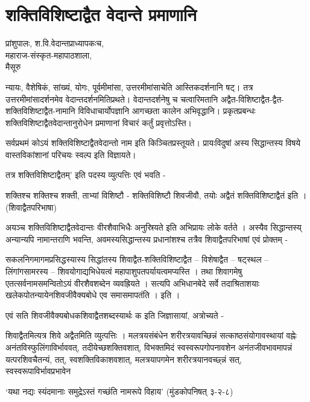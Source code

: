 \chapter{शक्तिविशिष्टाद्वैत वेदान्ते प्रमाणानि}

\begin{center}
\smallskip
प्रांशुपालः, श.वि.वेदान्तप्राध्यापकःच,\\
महाराज-संस्कृत-महापाठशाला,\\
मैसूरु
\addrule
\end{center}
न्यायः, वैशेषिकं, सांख्यं, योगः, पूर्वमीमांसा, उत्तरमीमांसाचेति आस्तिकदर्शनानि षट्। तत्र उत्तरमीमांसादर्शनमेव वेदान्तदर्शनमितिप्रथते। वेदान्तदर्शनेषु च चत्वारिमतानि अद्वैत-विशिष्टाद्वैत-द्वैत-शक्तिविशिष्टाद्वैत-नामानि विविधाचार्योपज्ञानि आगच्छता कालेन अभिवृद्धानि। प्रकृतप्रबन्धः शक्तिविशिष्टाद्वैतवेदान्तानुरोधेन प्रमाणानां विचारं कर्तुं प्रवृत्तोऽस्ति।

सर्वप्रथमं कोऽयं शक्तिविशिष्टाद्वैतवेदान्तो नाम इति किञ्चितप्रस्तूयते। प्रायःविदुषां अस्य सिद्धान्तस्य विषये वास्तविकांशानां परिचयः स्वल्प इति विज्ञायते।

तत्र  शक्तिविशिष्टाद्वैतम्’ इति पदस्य व्युत्पत्तिः एवं भवति -

शक्तिश्च शक्तिश्च शक्ती, ताभ्यां विशिष्टौ -  शक्तिविशिष्टौ शिवजीवौ, तयोः अद्वैतं शक्तिविशिष्टाद्वैतं इति ।(शिवाद्वैतपरिभाषा)

अयञ्च शक्तिविशिष्टाद्वैतवेदान्तः वीरशैवाभिधैः अनुस्रियते इति अभिप्रायः लोके वर्तते । अस्यैव सिद्धान्तस्य् अन्यान्यपि नामान्तराणि भवन्ति, अवमस्यसिद्धान्तस्य प्रधानांशश्च तत्रैव शिवाद्वैतपरिभाषां एवं प्रोक्तम् -

सकलनिगमागमप्रसिद्धस्यास्य सिद्धांतस्य शिवाद्वैत-शक्तिविशिष्टाद्वैत – विशेषाद्वैत – षट्स्थल – लिंगांगसामरस्य – शिवयोगाद्यभिधेयत्वं महापाशुपतपर्यायत्वमप्यस्ति । तथा शिवागमेषु एतत्सर्वनामसमन्वितोऽयं वीरशैवशब्देन व्यवह्रियते । सत्यपि अभिधानबेदे सर्वे तदाश्रिताशयाः खलेकपोतन्यायेनशिवजीवैक्यबोधे एव समासमापतंति । इति ।

एवं सति शिवजीवैक्यबोधकशिवाद्वैतशब्दस्यार्थः क  इति जिज्ञासायां, अत्रोच्यते -

शिवाद्वैतमित्यत्र शिवे अद्वैतमिति व्युत्पत्तिः । मलत्रयसंबंधेन शरीरत्रयावच्छिन्नं सत्काष्ठसंयोगावस्थायां वह्नेः अनंतविस्फुलिंगाविर्भाववत्, तदीयेच्छशक्तिवशात्, विभक्तमिदं स्वस्वरूपगोपनावशेन अनंतजीवभावमापन्नं यत्परशिवचैतन्यं, तत्, स्वशक्तिविकाशवशात्, मलत्रयापगमेन शरीरत्रयानवच्छ्न्नं सत्,  स्वस्वरूपाविर्भावप्रभावेन

‘यथा नद्यः स्यंदमानाः समुद्रेऽस्तं गच्छंति नामरूपे विहाय’ (मुंडकोपनिषत् ३-२-८)

